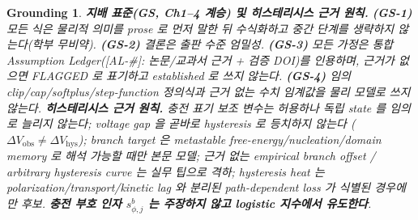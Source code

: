\documentclass[11pt,a4paper]{article}
\newtheorem*{groundingbox}{Grounding}
\newcommand{\hys}{\mathrm{hys}}
\newcommand{\obs}{\mathrm{obs}}
\newcommand{\AL}[1]{\textsf{[AL-#1]}}
\begin{document}
\begin{groundingbox}
\textbf{지배 표준(GS, Ch1--4 계승) 및 히스테리시스 근거 원칙.} \textbf{(GS-1)} 모든 식은 물리적 의미를 prose 로
먼저 말한 뒤 수식화하고 중간 단계를 생략하지 않는다(학부 무비약). \textbf{(GS-2)} 결론은 출판 수준 엄밀성.
\textbf{(GS-3)} 모든 가정은 통합 Assumption Ledger(\AL{\#}: 논문/교과서 근거 + 검증 DOI)를 인용하며, 근거가
없으면 FLAGGED 로 표기하고 established 로 쓰지 않는다. \textbf{(GS-4)} 임의 clip/cap/softplus/step-function
정의식과 근거 없는 수치 임계값을 물리 모델로 쓰지 않는다. \textbf{히스테리시스 근거 원칙.} 충전 표기 보조
변수는 허용하나 독립 state 를 임의로 늘리지 않는다; voltage gap 을 곧바로 hysteresis 로 등치하지 않는다
($\Delta V_\obs\ne\Delta V_\hys$); branch target 은 metastable free-energy/nucleation/domain memory 로 해석
가능할 때만 본문 모델; 근거 없는 empirical branch offset / arbitrary hysteresis curve 는 실무 팁으로 격하;
hysteresis heat 는 polarization/transport/kinetic lag 와 분리된 path-dependent loss 가 식별된 경우에만 후보.
\textbf{충전 부호 인자 $s_{\phi,j}^b$ 는 주장하지 않고 logistic 지수에서 유도한다}.
\end{groundingbox}

\tableofcontents
\newpage

\end{document}
